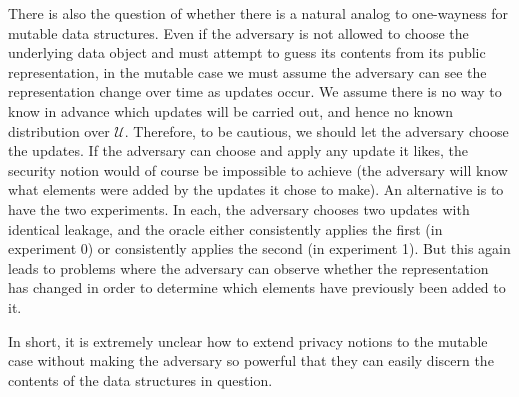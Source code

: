 \documentclass[11pt, pdftex]{article}
\begin{document}
There is also the question of whether there is a natural analog to one-wayness for mutable data structures. Even if the adversary is not allowed to choose the underlying data object and must attempt to guess its contents from its public representation, in the mutable case we must assume the adversary can see the representation change over time as updates occur. We assume there is no way to know in advance which updates will be carried out, and hence no known distribution over $\mathcal{U}$. Therefore, to be cautious, we should let the adversary choose the updates. If the adversary can choose and apply any update it likes, the security notion would of course be impossible to achieve (the adversary will know what elements were added by the updates it chose to make). An alternative is to have the two experiments. In each, the adversary chooses two updates with identical leakage, and the oracle either consistently applies the first (in experiment 0) or consistently applies the second (in experiment 1). But this again leads to problems where the adversary can observe whether the representation has changed in order to determine which elements have previously been added to it.

In short, it is extremely unclear how to extend privacy notions to the mutable case without making the adversary so powerful that they can easily discern the contents of the data structures in question.

%
\end{document}
